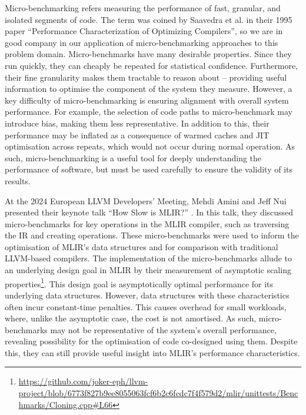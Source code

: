 Micro-benchmarking refers measuring the performance of fast, granular, and isolated segments of code.
The term was coined by Saavedra et al. in their 1995 paper \cite{saavedraPerformanceCharacterizationOptimizing1995} ``Performance Characterization of Optimizing Compilers'', so we are in good company in our application of micro-benchmarking approaches to this problem domain.
Micro-benchmarks have many desirable properties. Since they run quickly, they can cheaply be repeated for statistical confidence.
Furthermore, their fine granularity makes them tractable to reason about -- providing useful information to optimise the component of the system they measure.
However, a key difficulty of micro-benchmarking is ensuring alignment with overall system performance. For example, the selection of code paths to micro-benchmark may introduce bias, making them less representative. In addition to this, their performance may be inflated as a consequence of warmed caches and JIT optimisation across repeats, which would not occur during normal operation.
As such, micro-benchmarking is a useful tool for deeply understanding the performance of software, but must be used carefully to ensure the validity of its results.

At the 2024 European LLVM Developers' Meeting, Mehdi Amini and Jeff Nui
presented their keynote talk ``How Slow is MLIR?'' \cite{aminiHowSlowMLIR2024}.
In this talk, they discussed micro-benchmarks for key operations in the MLIR compiler, such as traversing the IR and creating operations. These micro-benchmarks were used to inform the optimisation of MLIR's data structures and for comparison with traditional LLVM-based compilers. The implementation of the micro-benchmarks allude to an underlying design goal in MLIR by their measurement of asymptotic scaling properties\footnote{\url{https://github.com/joker-eph/llvm-project/blob/6773f827b9ee8055063fcf6b2c6fcdc7f4f579d2/mlir/unittests/Benchmarks/Cloning.cpp\#L66}}. This design goal is asymptotically optimal performance for its underlying data structures. However, data structures with these characteristics often incur constant-time penalties. %
This causes overhead for small workloads, where, unlike the asymptotic case, the cost is not amortised. As such, micro-benchmarks may not be representative of the system's overall performance, revealing possibility for the optimisation of code co-designed using them.
Despite this, they can still provide useful insight into MLIR's performance characteristics. 


